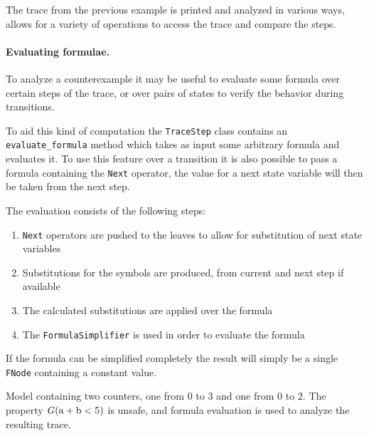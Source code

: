 \begin{listing}
    \label{alg:model-checking-traces}
    \caption{The trace from the previous example is printed and analyzed in various ways, \pyvmt{} allows for a variety of operations to access the trace and compare the steps.}
\end{listing}

\paragraph*{Evaluating formulae.}
To analyze a counterexample it may be useful to evaluate some formula over certain steps of the trace, or over pairs of states to verify the behavior during transitions.

To aid this kind of computation the \texttt{TraceStep} class contains an \texttt{evaluate\_formula} method which takes as input some arbitrary \pysmt{} formula and evaluates it.
To use this feature over a transition it is also possible to pass a formula containing the \texttt{Next} operator, the value for a next state variable will then be taken from the next step.

The evaluation consists of the following steps:
\begin{enumerate}
    \item \texttt{Next} operators are pushed to the leaves to allow for substitution of next state variables
    \item Substitutions for the symbols are produced, from current and next step if available
    \item The calculated substitutions are applied over the formula
    \item The \texttt{FormulaSimplifier} is used in order to evaluate the formula
\end{enumerate}

If the formula can be simplified completely the result will simply be a single \texttt{FNode} containing a constant value.

\begin{listing}[H]
    \label{alg:model-checking-evaluation}
    \caption{Model containing two counters, one from 0 to 3 and one from 0 to 2. The property $\G (\mathrm{a} + \mathrm{b} < 5)$ is unsafe, and formula evaluation is used to analyze the resulting trace.}
\end{listing}

